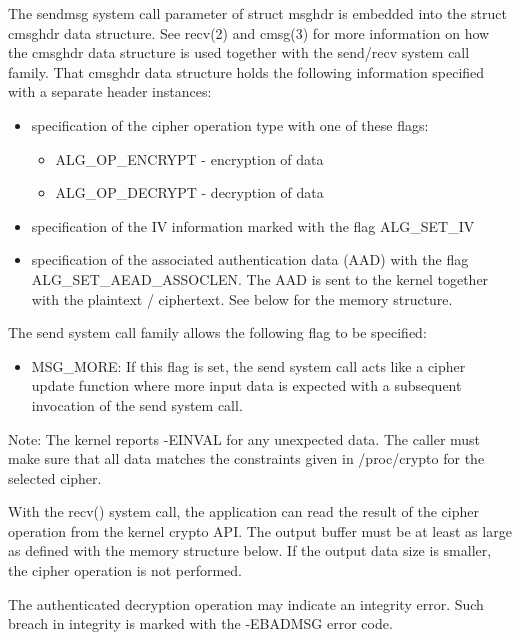 \documentclass[a4paper,8pt,english]{sphinxmanual}
\begin{document}
The sendmsg system call parameter of struct msghdr is embedded into the
struct cmsghdr data structure. See recv(2) and cmsg(3) for more
information on how the cmsghdr data structure is used together with the
send/recv system call family. That cmsghdr data structure holds the
following information specified with a separate header instances:
\begin{itemize}
\item {} 
specification of the cipher operation type with one of these flags:
\begin{itemize}
\item {} 
ALG\_OP\_ENCRYPT - encryption of data

\item {} 
ALG\_OP\_DECRYPT - decryption of data

\end{itemize}

\item {} 
specification of the IV information marked with the flag ALG\_SET\_IV

\item {} 
specification of the associated authentication data (AAD) with the
flag ALG\_SET\_AEAD\_ASSOCLEN. The AAD is sent to the kernel together
with the plaintext / ciphertext. See below for the memory structure.

\end{itemize}

The send system call family allows the following flag to be specified:
\begin{itemize}
\item {} 
MSG\_MORE: If this flag is set, the send system call acts like a
cipher update function where more input data is expected with a
subsequent invocation of the send system call.

\end{itemize}

Note: The kernel reports -EINVAL for any unexpected data. The caller
must make sure that all data matches the constraints given in
/proc/crypto for the selected cipher.

With the recv() system call, the application can read the result of the
cipher operation from the kernel crypto API. The output buffer must be
at least as large as defined with the memory structure below. If the
output data size is smaller, the cipher operation is not performed.

The authenticated decryption operation may indicate an integrity error.
Such breach in integrity is marked with the -EBADMSG error code.
\end{document}
